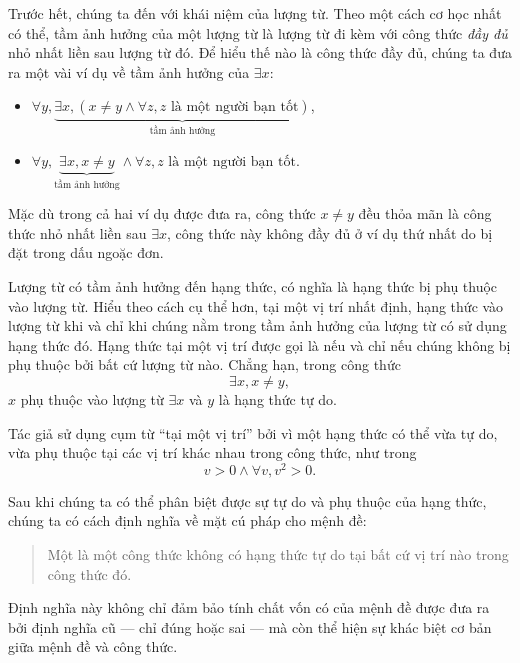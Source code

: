 Trước hết, chúng ta đến với khái niệm  của lượng từ. Theo một cách cơ học nhất có thể, tầm ảnh hưởng của một lượng từ là lượng từ đi kèm với công thức \emph{đầy đủ} nhỏ nhất liền sau lượng từ đó. Để hiểu thế nào là công thức đầy đủ, chúng ta đưa ra một vài ví dụ về tầm ảnh hưởng của $\exists x$:
\begin{itemize}
    \item $\forall y, \underbrace{\exists x, (x \neq y \land \forall z, z \text{ là một người bạn tốt})}_{\text{tầm ảnh hưởng}}$,
    \item $\forall y, \underbrace{\exists x, x \neq y}_{\text{tầm ảnh hưởng}} \land \forall z, z \text{ là một người bạn tốt}$.
\end{itemize}
Mặc dù trong cả hai ví dụ được đưa ra, công thức $x \neq y$ đều thỏa mãn là công thức nhỏ nhất liền sau $\exists x$, công thức này không đầy đủ ở ví dụ thứ nhất do bị đặt trong dấu ngoặc đơn.

Lượng từ có tầm ảnh hưởng đến hạng thức, có nghĩa là hạng thức bị phụ thuộc vào lượng từ. Hiểu theo cách cụ thể hơn, tại một vị trí nhất định, hạng thức  vào lượng từ khi và chỉ khi chúng nằm trong tầm ảnh hưởng của lượng từ có sử dụng hạng thức đó. Hạng thức tại một vị trí được gọi là  nếu và chỉ nếu chúng không bị phụ thuộc bởi bất cứ lượng từ nào. Chẳng hạn, trong công thức
\begin{equation*}
    \exists x, x \neq y, 
\end{equation*}
$x$ phụ thuộc vào lượng từ $\exists x$ và $y$ là hạng thức tự do.

Tác giả sử dụng cụm từ ``tại một vị trí'' bởi vì một hạng thức có thể vừa tự do, vừa phụ thuộc tại các vị trí khác nhau trong công thức, như trong
\begin{equation*}
    v > 0 \land \forall v, v^2 > 0.
\end{equation*}

Sau khi chúng ta có thể phân biệt được sự tự do và phụ thuộc của hạng thức, chúng ta có cách định nghĩa về mặt cú pháp cho mệnh đề:
\begin{quotation}
    Một  là một công thức không có hạng thức tự do tại bất cứ vị trí nào trong công thức đó.
\end{quotation}
Định nghĩa này không chỉ đảm bảo tính chất vốn có của mệnh đề được đưa ra bởi định nghĩa cũ --- chỉ đúng hoặc sai --- mà còn thể hiện sự khác biệt cơ bản giữa mệnh đề và công thức.

